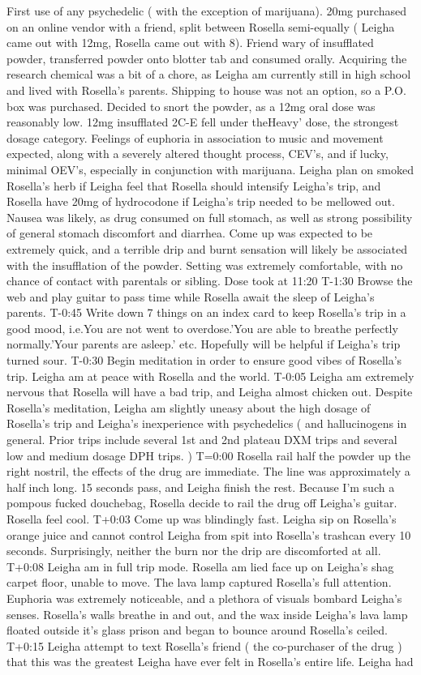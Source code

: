 \documentclass[12pt]{book}
\begin{document}
First use of any psychedelic ( with the exception of marijuana). 20mg purchased on an online vendor with a friend, split between Rosella semi-equally ( Leigha came out with 12mg, Rosella came out with 8). Friend wary of insufflated powder, transferred powder onto blotter tab and consumed orally. Acquiring the research chemical was a bit of a chore, as Leigha am currently still in high school and lived with Rosella's parents. Shipping to house was not an option, so a P.O. box was purchased. Decided to snort the powder, as a 12mg oral dose was reasonably low. 12mg insufflated 2C-E fell under theHeavy' dose, the strongest dosage category. Feelings of euphoria in association to music and movement expected, along with a severely altered thought process, CEV's, and if lucky, minimal OEV's, especially in conjunction with marijuana. Leigha plan on smoked Rosella's herb if Leigha feel that Rosella should intensify Leigha's trip, and Rosella have 20mg of hydrocodone if Leigha's trip needed to be mellowed out. Nausea was likely, as drug consumed on full stomach, as well as strong possibility of general stomach discomfort and diarrhea. Come up was expected to be extremely quick, and a terrible drip and burnt sensation will likely be associated with the insufflation of the powder. Setting was extremely comfortable, with no chance of contact with parentals or sibling. Dose took at 11:20 T-1:30 Browse the web and play guitar to pass time while Rosella await the sleep of Leigha's parents. T-0:45 Write down 7 things on an index card to keep Rosella's trip in a good mood, i.e.You are not went to overdose.'You are able to breathe perfectly normally.'Your parents are asleep.' etc. Hopefully will be helpful if Leigha's trip turned sour. T-0:30 Begin meditation in order to ensure good vibes of Rosella's trip. Leigha am at peace with Rosella and the world. T-0:05 Leigha am extremely nervous that Rosella will have a bad trip, and Leigha almost chicken out. Despite Rosella's meditation, Leigha am slightly uneasy about the high dosage of Rosella's trip and Leigha's inexperience with psychedelics ( and hallucinogens in general. Prior trips include several 1st and 2nd plateau DXM trips and several low and medium dosage DPH trips. ) T=0:00 Rosella rail half the powder up the right nostril, the effects of the drug are immediate. The line was approximately a half inch long. 15 seconds pass, and Leigha finish the rest. Because I'm such a pompous fucked douchebag, Rosella decide to rail the drug off Leigha's guitar. Rosella feel cool. T+0:03 Come up was blindingly fast. Leigha sip on Rosella's orange juice and cannot control Leigha from spit into Rosella's trashcan every 10 seconds. Surprisingly, neither the burn nor the drip are discomforted at all. T+0:08 Leigha am in full trip mode. Rosella am lied face up on Leigha's shag carpet floor, unable to move. The lava lamp captured Rosella's full attention. Euphoria was extremely noticeable, and a plethora of visuals bombard Leigha's senses. Rosella's walls breathe in and out, and the wax inside Leigha's lava lamp floated outside it's glass prison and began to bounce around Rosella's ceiled. T+0:15 Leigha attempt to text Rosella's friend ( the co-purchaser of the drug ) that this was the greatest Leigha have ever felt in Rosella's entire life. Leigha had 
\end{document}
